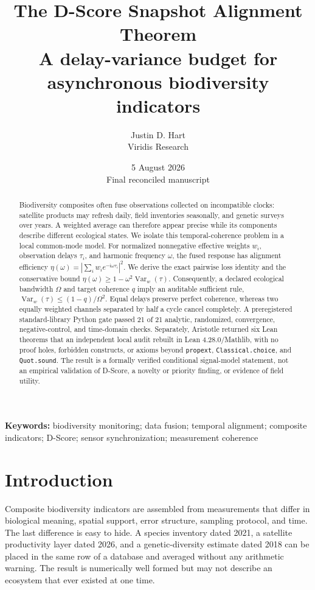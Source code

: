 \documentclass[10pt]{article}
\title{\vspace{-1.2em}\textbf{The D-Score Snapshot Alignment Theorem}\\
\large A delay-variance budget for asynchronous biodiversity indicators}
\author{Justin D. Hart\\\small Viridis Research}
\date{5 August 2026\\\small Final reconciled manuscript}
\newcommand{\Var}{\operatorname{Var}}
\begin{document}
\maketitle

\begin{abstract}
Biodiversity composites often fuse observations collected on incompatible
clocks: satellite products may refresh daily, field inventories seasonally,
and genetic surveys over years.  A weighted average can therefore appear
precise while its components describe different ecological states.  We isolate
this temporal-coherence problem in a local common-mode model.  For normalized
nonnegative effective weights $w_i$, observation delays $\tau_i$, and harmonic
frequency $\omega$, the fused response has alignment efficiency
\(
\eta(\omega)=\left|\sum_i w_i e^{-\mathrm{i}\omega\tau_i}\right|^2.
\)
We derive the exact pairwise loss identity and the conservative bound
\(
\eta(\omega)\ge 1-\omega^2\Var_w(\tau).
\)
Consequently, a declared ecological bandwidth $\Omega$ and target coherence
$q$ imply an auditable sufficient rule,
\(
\Var_w(\tau)\le(1-q)/\Omega^2.
\)
Equal delays preserve perfect coherence, whereas two equally weighted channels
separated by half a cycle cancel completely.  A preregistered standard-library
Python gate passed 21 of 21 analytic, randomized, convergence, negative-control,
and time-domain checks.  Separately, Aristotle returned six Lean theorems that
an independent local audit rebuilt in Lean 4.28.0/Mathlib, with no proof holes,
forbidden constructs, or axioms beyond \texttt{propext},
\texttt{Classical.choice}, and \texttt{Quot.sound}.  The result is a formally
verified conditional signal-model statement, not an empirical validation of
D-Score, a novelty or priority finding, or evidence of field utility.
\end{abstract}

\textbf{Keywords:} biodiversity monitoring; data fusion; temporal alignment;
composite indicators; D-Score; sensor synchronization; measurement coherence

\section{Introduction}

Composite biodiversity indicators are assembled from measurements that differ
in biological meaning, spatial support, error structure, sampling protocol, and
time.  The last difference is easy to hide.  A species inventory dated 2021, a
satellite productivity layer dated 2026, and a genetic-diversity estimate dated
2018 can be placed in the same row of a database and averaged without any
arithmetic warning.  The result is numerically well formed but may not describe
an ecosystem that ever existed at one time.
\end{document}
